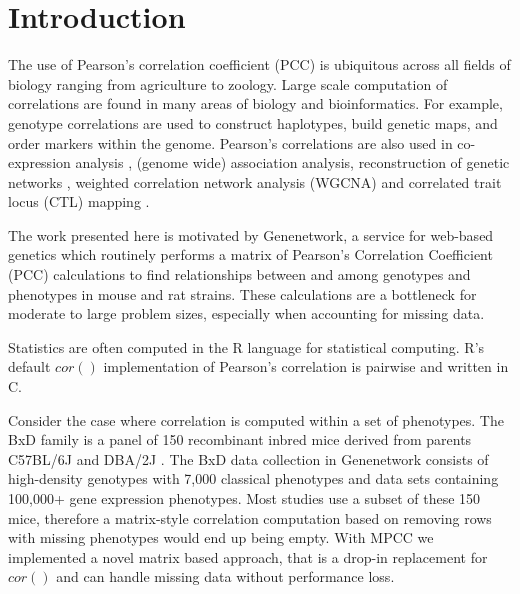 \documentclass{bioinfo}
\begin{document}
\maketitle


\section{Introduction}

The use of Pearson's correlation coefficient (PCC) is ubiquitous
across all fields of biology ranging from agriculture to
zoology. Large scale computation of correlations are found in many
areas of biology and bioinformatics.  For example, genotype
correlations are used to construct haplotypes, build genetic maps, and
order markers within the genome. Pearson's correlations are also used
in co-expression analysis \citep{Tesson:2010}, (genome wide)
association analysis, reconstruction of genetic
networks \citep{Fukushima:2013}, weighted correlation network analysis
(WGCNA) \citep{Horvath:2008} and correlated trait locus (CTL)
mapping \citep{Arends2016a}.



\enlargethispage{12pt}

The work presented here is motivated by Genenetwork, a service for
web-based genetics \citep{Sloan2016} which routinely performs a matrix
of Pearson's Correlation Coefficient (PCC) calculations to find
relationships between and among genotypes and phenotypes in mouse and
rat strains. These calculations are a bottleneck for moderate to large
problem sizes, especially when accounting for missing data.

Statistics are often computed in the R language for statistical
computing\citep{R:2005}. R's default $cor()$ implementation of
Pearson's correlation is pairwise and written in C.

Consider the case where correlation is computed within a set of
phenotypes. The BxD family is a panel of 150 recombinant inbred mice
derived from parents C57BL/6J and DBA/2J \citep{Ashbrook:2019}. The
BxD data collection in Genenetwork consists of high-density genotypes
with 7,000 classical phenotypes and data sets containing 100,000+ gene
expression phenotypes.  Most studies use a subset of these 150 mice,
therefore a matrix-style correlation computation based on removing
rows with missing phenotypes would end up being empty.  With MPCC we
implemented a novel matrix based approach, that is a drop-in
replacement for $cor()$ and can handle missing data without
performance loss.
\end{document}
